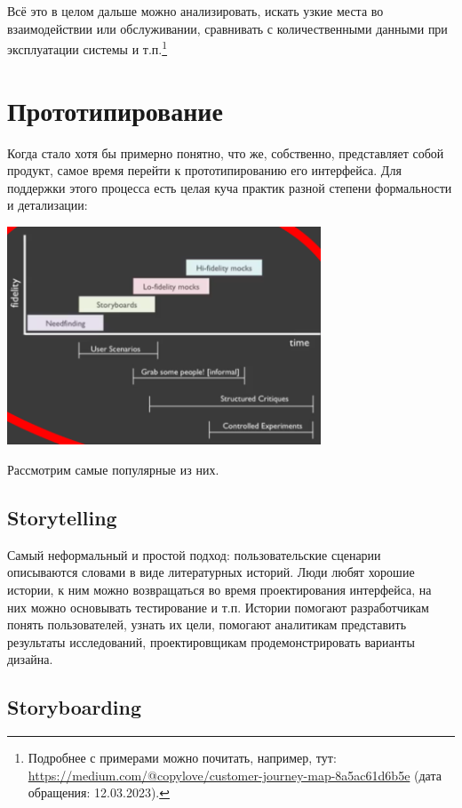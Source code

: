 \documentclass{../../text-style}
\begin{document}
Всё это в целом дальше можно анализировать, искать узкие места во взаимодействии или обслуживании, сравнивать с количественными данными при эксплуатации системы и т.п.\footnote{Подробнее с примерами можно почитать, например, тут: \url{https://medium.com/@copylove/customer-journey-map-8a5ac61d6b5e} (дата обращения: 12.03.2023).}

\section{Прототипирование}

Когда стало хотя бы примерно понятно, что же, собственно, представляет собой продукт, самое время перейти к прототипированию его интерфейса. Для поддержки этого процесса есть целая куча практик разной степени формальности и детализации:

\begin{center}
    \includegraphics[width=0.7\textwidth]{prototypingTechniques.png}
\end{center}

Рассмотрим самые популярные из них.

\subsection{Storytelling}

Самый неформальный и простой подход: пользовательские сценарии описываются словами в виде литературных историй. Люди любят хорошие истории, к ним можно возвращаться во время проектирования интерфейса, на них можно основывать тестирование и т.п. Истории помогают разработчикам понять пользователей, узнать их цели, помогают аналитикам представить результаты исследований, проектировщикам продемонстрировать варианты дизайна.

\subsection{Storyboarding}
\end{document}
